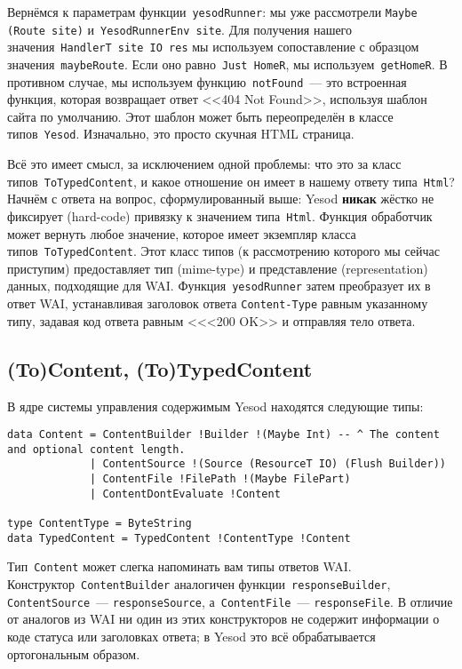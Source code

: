 Вернёмся к параметрам функции~\lstinline'yesodRunner': мы уже рассмотрели
\lstinline'Maybe (Route site)' и~\lstinline'YesodRunnerEnv site'. Для получения
нашего значения~\lstinline'HandlerT site IO res' мы используем сопоставление с
образцом значения~\lstinline'maybeRoute'. Если оно равно~\lstinline'Just HomeR',
мы используем~\lstinline'getHomeR'. В противном случае, мы используем
функцию~\lstinline'notFound'~--- это встроенная функция, которая возвращает
ответ <<404 Not Found>>, используя шаблон сайта по умолчанию. Этот шаблон может
быть переопределён в классе типов~\lstinline'Yesod'. Изначально, это просто
скучная HTML страница.

Всё это имеет смысл, за исключением одной проблемы: что это за класс
типов~\lstinline'ToTypedContent', и какое отношение он имеет в нашему ответу
типа~\lstinline'Html'? Начнём с ответа на вопрос, сформулированный выше: Yesod
\textbf{никак} жёстко не фиксирует (hard-code) привязку к значением
типа~\lstinline'Html'. Функция обработчик может вернуть любое значение, которое
имеет экземпляр класса типов~\lstinline'ToTypedContent'. Этот класс типов
(к рассмотрению которого мы сейчас приступим) предоставляет тип (mime-type) и
представление (representation) данных, подходящие для WAI.
Функция~\lstinline'yesodRunner' затем преобразует их в ответ WAI, устанавливая
заголовок ответа \texttt{Content-Type} равным указанному типу, задавая код ответа
равным <<<200 OK>> и отправляя тело ответа.

\subsection{(To)Content, (To)TypedContent}
В ядре системы управления содержимым Yesod находятся следующие типы:
\begin{lstlisting}
data Content = ContentBuilder !Builder !(Maybe Int) -- ^ The content and optional content length.
             | ContentSource !(Source (ResourceT IO) (Flush Builder))
             | ContentFile !FilePath !(Maybe FilePart)
             | ContentDontEvaluate !Content

type ContentType = ByteString
data TypedContent = TypedContent !ContentType !Content
\end{lstlisting}

Тип~\lstinline'Content' может слегка напоминать вам типы ответов WAI.
Конструктор~\lstinline'ContentBuilder' аналогичен
функции~\lstinline'responseBuilder', \lstinline'ContentSource'~---
\lstinline'responseSource', а~\lstinline'ContentFile'~---
\lstinline'responseFile'. В отличие от аналогов из WAI ни один из этих
конструкторов не содержит информации о коде статуса или заголовках ответа; в
Yesod это всё обрабатывается ортогональным образом.

